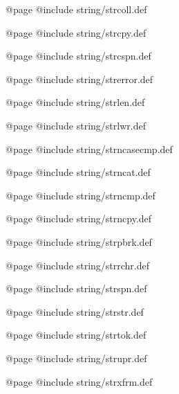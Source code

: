 @page
@include string/strcoll.def

@page
@include string/strcpy.def

@page
@include string/strcspn.def

@page
@include string/strerror.def

@page
@include string/strlen.def

@page
@include string/strlwr.def

@page
@include string/strncasecmp.def

@page
@include string/strncat.def

@page
@include string/strncmp.def

@page
@include string/strncpy.def

@page
@include string/strpbrk.def

@page
@include string/strrchr.def

@page
@include string/strspn.def

@page
@include string/strstr.def

@page
@include string/strtok.def

@page
@include string/strupr.def

@page
@include string/strxfrm.def
